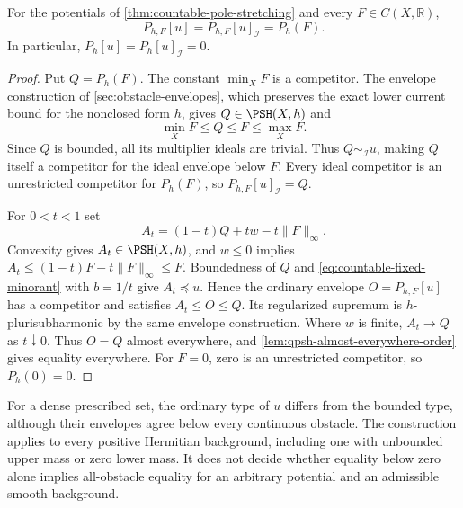 \begin{proposition}\label{prop:countable-pole-all-obstacles}
For the potentials of \cref{thm:countable-pole-stretching} and every $F\in C(X,\mathbb R)$,
\[
 P_{h,F}[u]=P_{h,F}[u]_{\mathcal I}=P_h(F).
\]
In particular, $P_h[u]=P_h[u]_{\mathcal I}=0$.
\end{proposition}
\begin{proof}
Put $Q=P_h(F)$. The constant $\min_XF$ is a competitor. The envelope construction of \cref{sec:obstacle-envelopes}, which preserves the exact lower current bound for the nonclosed form $h$, gives $Q\in\PSH(X,h)$ and
\[
 \min_XF\leq Q\leq F\leq\max_XF.
\]
Since $Q$ is bounded, all its multiplier ideals are trivial. Thus $Q\sim_{\mathcal I}u$, making $Q$ itself a competitor for the ideal envelope below $F$. Every ideal competitor is an unrestricted competitor for $P_h(F)$, so $P_{h,F}[u]_{\mathcal I}=Q$.

For $0<t<1$ set
\[
 A_t=(1-t)Q+tw-t\|F\|_\infty.
\]
Convexity gives $A_t\in\PSH(X,h)$, and $w\leq0$ implies $A_t\leq(1-t)F-t\|F\|_\infty\leq F$. Boundedness of $Q$ and \eqref{eq:countable-fixed-minorant} with $b=1/t$ give $A_t\preceq u$. Hence the ordinary envelope $O=P_{h,F}[u]$ has a competitor and satisfies $A_t\leq O\leq Q$. Its regularized supremum is $h$-plurisubharmonic by the same envelope construction. Where $w$ is finite, $A_t\to Q$ as $t\downarrow0$. Thus $O=Q$ almost everywhere, and \cref{lem:qpsh-almost-everywhere-order} gives equality everywhere. For $F=0$, zero is an unrestricted competitor, so $P_h(0)=0$.
\end{proof}

For a dense prescribed set, the ordinary type of $u$ differs from the bounded type, although their envelopes agree below every continuous obstacle. The construction applies to every positive Hermitian background, including one with unbounded upper mass or zero lower mass. It does not decide whether equality below zero alone implies all-obstacle equality for an arbitrary potential and an admissible smooth background.
